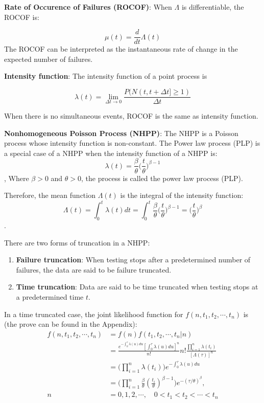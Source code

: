 \documentclass[12pt]{book}
\numberwithin{equation}{chapter}
\providecommand{\tightlist}{%
  \setlength{\itemsep}{0pt}\setlength{\parskip}{0pt}}
\begin{document}
\textbf{Rate of Occurence of Failures (ROCOF)}: When \(\Lambda\) is differentiable, the ROCOF is:

\[\mu(t) = \frac{d}{dt}\Lambda(t)\]
The ROCOF can be interpreted as the instantaneous rate of change in the expected number of failures.

\textbf{Intensity function}: The intensity function of a point process is

\[\lambda(t) = \lim_{\Delta t \rightarrow 0}\frac{P(N(t, t+\Delta t] \geq 1)}{\Delta t}\]

When there is no simultaneous events, ROCOF is the same as intensity function.

\textbf{Nonhomogeneous Poisson Process (NHPP)}: The NHPP is a Poisson process whose intensity function is non-constant. The Power law process (PLP) is a special case of a NHPP when the intensity function of a NHPP is:
\[\lambda(t) = \frac{\beta}{\theta}\bigg(\frac{t}{\theta}\bigg)^{\beta-1}\],
Where \(\beta > 0\) and \(\theta > 0\), the process is called the power law process (PLP).

Therefore, the mean function \(\Lambda(t)\) is the integral of the intensity function:
\[\Lambda(t) = \int_0^t \lambda(t)dt = \int_0^t \frac{\beta}{\theta}\bigg(\frac{t}{\theta}\bigg)^{\beta-1} = \bigg(\frac{t}{\theta}\bigg)^{\beta}\].

There are two forms of truncation in a NHPP:

\begin{enumerate}
\def\labelenumi{\arabic{enumi}.}
\tightlist
\item
  \textbf{Failure truncation}: When testing stops after a predetermined number of failures, the data are said to be failure truncated.
\item
  \textbf{Time truncation}: Data are said to be time truncated when testing stops at a predetermined time \(t\).
\end{enumerate}

In a time truncated case, the joint likelihood function for \(f(n, t_1, t_2, \cdots, t_n)\) is (the prove can be found in the Appendix):
\begin{equation}\label{pdftau}
\begin{aligned}
f(n, t_1, t_2, \cdots, t_n) & = f(n)f(t_1, t_2, \cdots, t_n|n)\\
& = \frac{e^{-\int_0^\tau \lambda(u)du}[\int_0^\tau \lambda(u)du]^n}{n!}n!\frac{\prod_{i=1}^n\lambda(t_i)}{[\Lambda(\tau)]^n}\\
& = \Big(\prod_{i=1}^n\lambda(t_i) \Big)e^{-\int_0^\tau \lambda(u)du}\\
& = \Big(\prod_{i=1}^n\frac{\beta}{\theta}(\frac{t_i}{\theta})^{\beta - 1} \Big)e^{-(\tau/\theta)^\beta},\\ 
n & = 0, 1, 2, \cdots, \quad  0 < t_1 < t_2 < \cdots < t_n
\end{aligned}
\end{equation}
\end{document}
